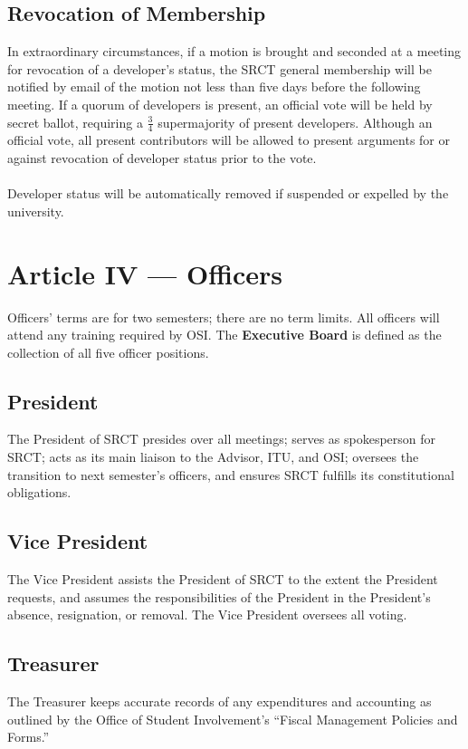 \documentclass{article}
\begin{document}
  \subsection{Revocation of Membership}
  In extraordinary circumstances, if a motion is brought and seconded at 
  a meeting for revocation of a developer's status, the SRCT general membership
  will be notified by email of the motion not less than five days before the
  following meeting. If a quorum of developers is present, an official vote 
  will be held by secret ballot, requiring a $\frac{3}{4}$ supermajority of 
  present developers. Although an official vote, all present contributors will
  be allowed to present arguments for or against revocation of developer
  status prior to the vote. 
  \\ \\
  Developer status will be automatically removed if suspended or expelled by 
  the university.
  
  \section{Article IV --- Officers}
  Officers' terms are for two semesters; there are no term limits. All 
  officers will attend any training required by OSI. The 
  \textbf{Executive Board} is defined as the collection of all five
  officer positions.
  
  \subsection{President}
  The President of SRCT presides over all meetings; serves as 
  spokesperson for SRCT; acts as its main liaison to the Advisor, ITU, 
  and OSI; oversees the transition to next semester's officers, and 
  ensures SRCT fulfills its constitutional obligations.
  
  \subsection{Vice President}
  The Vice President assists the President of SRCT to the extent the 
  President requests, and assumes the responsibilities of the President 
  in the President's absence, resignation, or removal. The Vice 
  President oversees all voting.
  
  \subsection{Treasurer}
  The Treasurer keeps accurate records of any expenditures and 
  accounting as outlined by the Office of Student Involvement's 
  ``Fiscal Management Policies and Forms.''
  
\end{document}
